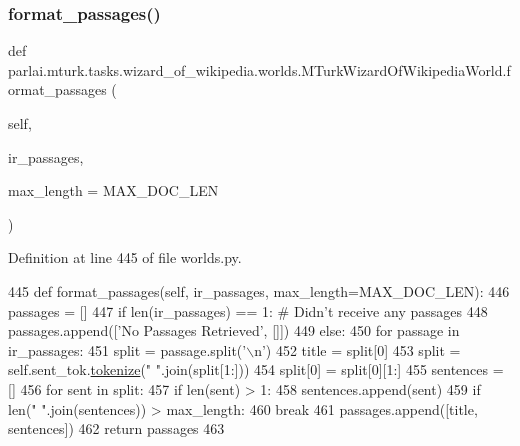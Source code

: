 \subsubsection{\texorpdfstring{format\+\_\+passages()}{format\_passages()}}
{\footnotesize\ttfamily def parlai.\+mturk.\+tasks.\+wizard\+\_\+of\+\_\+wikipedia.\+worlds.\+M\+Turk\+Wizard\+Of\+Wikipedia\+World.\+format\+\_\+passages (\begin{DoxyParamCaption}\item[{}]{self,  }\item[{}]{ir\+\_\+passages,  }\item[{}]{max\+\_\+length = {\ttfamily MAX\+\_\+DOC\+\_\+LEN} }\end{DoxyParamCaption})}



Definition at line 445 of file worlds.\+py.


\begin{DoxyCode}
445     \textcolor{keyword}{def }format\_passages(self, ir\_passages, max\_length=MAX\_DOC\_LEN):
446         passages = []
447         \textcolor{keywordflow}{if} len(ir\_passages) == 1:  \textcolor{comment}{# Didn't receive any passages}
448             passages.append([\textcolor{stringliteral}{'No Passages Retrieved'}, []])
449         \textcolor{keywordflow}{else}:
450             \textcolor{keywordflow}{for} passage \textcolor{keywordflow}{in} ir\_passages:
451                 split = passage.split(\textcolor{stringliteral}{'\(\backslash\)n'})
452                 title = split[0]
453                 split = self.sent\_tok.\hyperlink{namespaceparlai_1_1agents_1_1tfidf__retriever_1_1build__tfidf_a1fdb457e98eb4e4c26047e229686a616}{tokenize}(\textcolor{stringliteral}{" "}.join(split[1:]))
454                 split[0] = split[0][1:]
455                 sentences = []
456                 \textcolor{keywordflow}{for} sent \textcolor{keywordflow}{in} split:
457                     \textcolor{keywordflow}{if} len(sent) > 1:
458                         sentences.append(sent)
459                         \textcolor{keywordflow}{if} len(\textcolor{stringliteral}{" "}.join(sentences)) > max\_length:
460                             \textcolor{keywordflow}{break}
461                 passages.append([title, sentences])
462         \textcolor{keywordflow}{return} passages
463 
\end{DoxyCode}
\mbox{\label{classparlai_1_1mturk_1_1tasks_1_1wizard__of__wikipedia_1_1worlds_1_1MTurkWizardOfWikipediaWorld_a81fac69dc89399e21b1ad9847b62adea}} 

